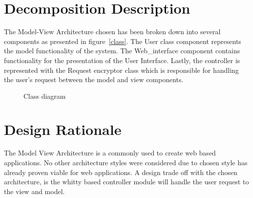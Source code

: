 \documentclass[letterpaper,12pt,oneside,listof=totoc]{scrreprt}
\begin{document}
\section{Decomposition Description}
The Model-View Architecture chosen has been broken down into several components as presented in figure~\ref{class}. The User class component represents the model functionality of the system. The Web\_interface component contains functionality for the presentation of the User Interface. Lastly, the controller is represented with the Request encryptor class which is responsible for handling the user's request between the model and view components.


\begin{figure}
\centering
{}
\caption{Class diagram}
\label{arch}
\end{figure}


\section{Design Rationale}
The Model View Architecture is a commonly used to create web based applications. No other architecture styles were considered due to chosen style has already proven viable for web applications. A design trade off with the chosen architecture, is the whitty based controller module will handle the user request to the view and model.  
\end{document}
